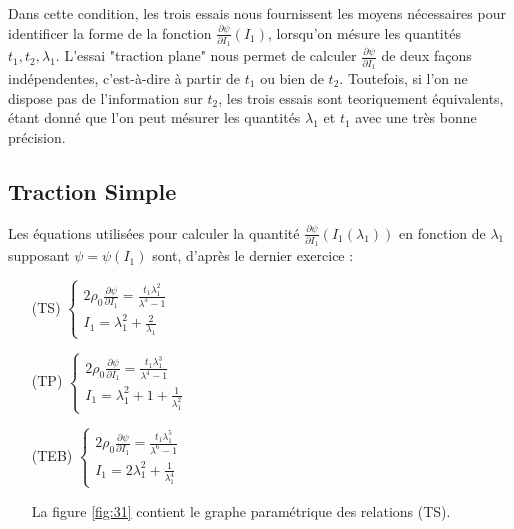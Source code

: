 \documentclass[a4paper,11pt]{article}
\begin{document}
Dans cette condition, les trois essais nous fournissent les moyens nécessaires pour identificer la forme de la fonction $\frac{\partial\psi}{\partial I_1} (I_1)$, lorsqu'on mésure les quantités $t_1, t_2, \lambda_1$. L'essai "traction plane" nous permet de calculer $\frac{\partial\psi}{\partial I_1}$ de deux façons indépendentes, c'est-à-dire à partir de $t_1$ ou bien de $t_2$. Toutefois, si l'on ne dispose pas de l'information sur $t_2$, les trois essais sont teoriquement équivalents, étant donné que l'on peut mésurer les quantités $\lambda_1$ et $t_1$ avec une très bonne précision.

\subsection {Traction Simple}
Les équations utilisées pour calculer la quantité $\frac{\partial\psi}{\partial I_1} (I_1(\lambda_1))$ en fonction de $\lambda_1$ supposant $\psi = \psi(I_1)$ sont, d'après le dernier exercice :
\begin{enumerate}
\item[(TS)]
$
\begin{cases}
2 \rho_0 \frac{\partial\psi}{\partial I_1} = \frac{t_1\lambda_1^2}{\lambda^3-1}\\
I_1 = \lambda_1^2 + \frac{2}{\lambda_1}
\end{cases}
$
\item[(TP)]
$
\begin{cases}
2 \rho_0 \frac{\partial\psi}{\partial I_1} = \frac{t_1\lambda_1^3}{\lambda^4-1}\\
I_1 = \lambda_1^2 + 1 + \frac{1}{\lambda_1^2}
\end{cases}
$
\item[(TEB)]
$
\begin{cases}
2 \rho_0 \frac{\partial\psi}{\partial I_1} = \frac{t_1\lambda_1^5}{\lambda^6-1}\\
I_1 = 2\lambda_1^2 + \frac{1}{\lambda_1^4}
\end{cases}
$

La figure \ref{fig:31} contient le graphe paramétrique des relations (TS).

\end{enumerate}
\end{document}
